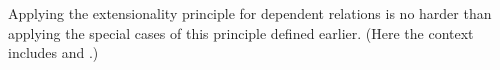 \begin{code}
\AgdaSpace{}%
\AgdaSpace{}%
\AgdaSpace{}%
\AgdaSpace{}%
\AgdaSpace{}%
\AgdaSpace{}%
\AgdaSpace{}%
\AgdaSpace{}%
\AgdaSpace{}%
\AgdaSpace{}%
\AgdaSpace{}%
\AgdaSpace{}%
\AgdaSpace{}%
\AgdaSpace{}%
\AgdaSpace{}%
\AgdaSpace{}%
\AgdaSpace{}%
\AgdaSpace{}%
\AgdaSpace{}%
\<%
\end{code}
\ccpad
Applying the extensionality principle for dependent relations is no harder than applying the special cases of this principle defined earlier. (Here the context includes 
\AgdaSymbol{(}\AgdaSpace{}%
\AgdaSymbol{:}\AgdaSpace{}%
\AgdaSpace{}%
\AgdaSpace{}%
\AgdaSpace{}%
\AgdaSymbol{)} and \AgdaSymbol{(}\AgdaSpace{}%
\AgdaSymbol{:}\AgdaSpace{}\AgdaSymbol{)}.)
\ccpad
\begin{code}%
\>[0][@{}l@{\AgdaIndent{1}}]%
\>[1]\AgdaSpace{}%
\AgdaSymbol{:}\AgdaSpace{}%
\AgdaSpace{}%
\AgdaSpace{}%
\<%
\\
\>[1][@{}l@{\AgdaIndent{0}}]%
\>[2]%
\>[17]\AgdaSymbol{\{}\AgdaSpace{}%
\AgdaSpace{}%
\AgdaSymbol{:}\AgdaSpace{}%
\AgdaSpace{}%
\AgdaSpace{}%
\AgdaSymbol{\}}\AgdaSpace{}%
\AgdaSpace{}%
\AgdaSpace{}%
\AgdaSpace{}%
\AgdaSpace{}%
\AgdaSpace{}%
\AgdaSpace{}%
\AgdaSpace{}%
\AgdaSpace{}%
\AgdaSpace{}%
\AgdaSpace{}%
\AgdaSpace{}%
\<%
\\
%
\>[1]\AgdaSpace{}%
\AgdaSpace{}%
\AgdaSpace{}%
\AgdaSpace{}%
\AgdaSpace{}%
\AgdaSymbol{=}\AgdaSpace{}%
%
\>[32]\AgdaSpace{}%
\AgdaSpace{}%
%
\>[41]\AgdaSpace{}%
\AgdaSpace{}%
\<%
\end{code}
